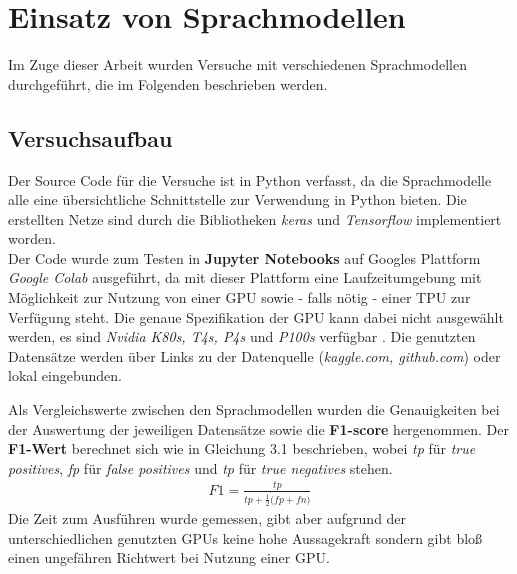 \chapter{Einsatz von Sprachmodellen}
Im Zuge dieser Arbeit wurden Versuche mit verschiedenen Sprachmodellen durchgef\"uhrt, die im Folgenden beschrieben werden.

\section{Versuchsaufbau}
Der Source Code f\"ur die Versuche ist in Python verfasst, da die Sprachmodelle alle eine \"ubersichtliche Schnittstelle zur Verwendung in Python bieten. Die erstellten Netze sind durch die Bibliotheken \textit{keras} \cite{keras} und \textit{Tensorflow} \cite{tensorflow} implementiert worden. \\
Der Code wurde zum Testen in \textbf{Jupyter Notebooks} auf Googles Plattform \textit{Google Colab} \cite{colab} ausgef\"uhrt, da mit dieser Plattform eine Laufzeitumgebung mit M\"oglichkeit zur Nutzung von einer GPU sowie - falls n\"otig - einer TPU zur Verf\"ugung steht. Die genaue Spezifikation der GPU kann dabei nicht ausgew\"ahlt werden, es sind \textit{Nvidia K80s, T4s, P4s} und \textit{P100s} verf\"ugbar \cite{colab_gpu}. Die genutzten Datens\"atze werden \"uber Links zu der Datenquelle (\textit{kaggle.com, github.com}) oder lokal eingebunden.

Als Vergleichswerte zwischen den Sprachmodellen wurden die Genauigkeiten bei der Auswertung der jeweiligen Datens\"atze sowie die \textbf{F1-score} hergenommen. Der \textbf{F1-Wert} berechnet sich wie in Gleichung 3.1 beschrieben, wobei \textit{tp} f\"ur \textit{true positives}, \textit{fp} f\"ur \textit{false positives} und \textit{tp} f\"ur \textit{true negatives} stehen.
\begin{align}
   F1 {=} \frac{tp}{tp + \frac{1}{2} \dot (fp + fn)}
\end{align}
Die Zeit zum Ausf\"uhren wurde gemessen, gibt aber aufgrund der unterschiedlichen genutzten GPUs keine hohe Aussagekraft sondern gibt blo{\ss} einen ungef\"ahren Richtwert bei Nutzung einer GPU.

